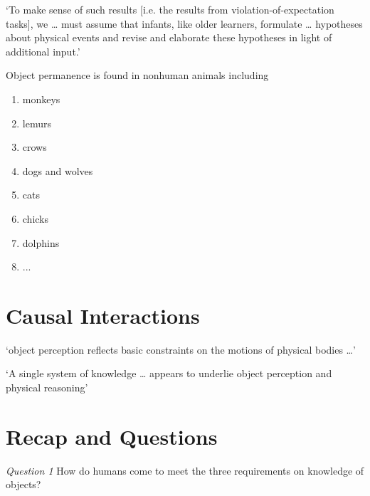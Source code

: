 \documentclass[12pt]{extarticle}
\begin{document}
\begin{multicols}{3}
‘To make sense of such results [i.e. the results from violation-of-expectation tasks], we … must assume that infants, like older learners, formulate … hypotheses about physical events and revise and elaborate these hypotheses in light of additional input.’
\citep[p.\ 329]{Aguiar:2002ob}
 
Object permanence is found in nonhuman animals including
 
\begin{enumerate}
 
\item monkeys \citep{santos:2006_cotton-top}
 
\item lemurs \citep{deppe:2009_object}
 
\item crows \citep{hoffmann:2011_ontogeny}
 
\item dogs and wolves \citep{fiset:2013_object}
 
\item cats \citep{triana:1981_object}
 
\item chicks \citep{chiandetti:2011_chicks_op}
 
\item dolphins \citep{jaakkola:2010_what}
 
\item ...
 
\end{enumerate}
 
 
 
\section{Causal Interactions}
 
‘object perception reflects basic constraints on the motions of physical bodies …’
\citep[p.\ 51]{Spelke:1990jn}
 
‘A single system of knowledge … appears to underlie object perception and physical reasoning’
\citep[p.\ 175]{Carey:1994bh}
 
 
 
\section{Recap and Questions}
 
\emph{Question 1}  How do humans come to meet the three requirements on knowledge of objects?
 

\end{multicols}
\end{document}
